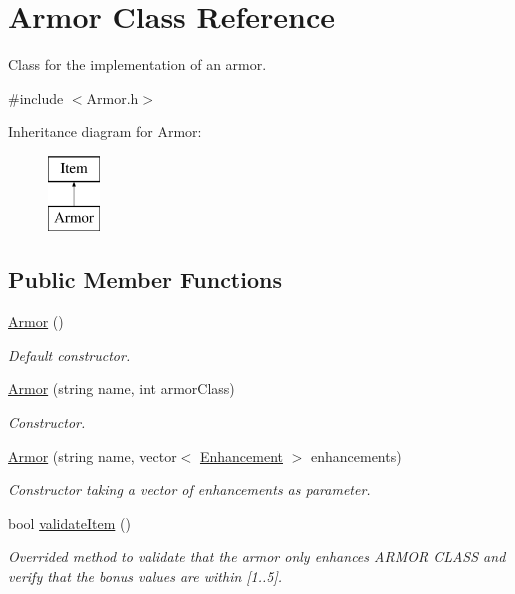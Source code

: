 \hypertarget{class_armor}{}\section{Armor Class Reference}
\label{class_armor}


Class for the implementation of an armor.  




{\ttfamily \#include $<$Armor.\+h$>$}

Inheritance diagram for Armor\+:\begin{figure}[H]
\begin{center}
\leavevmode
\includegraphics[height=2.000000cm]{class_armor}
\end{center}
\end{figure}
\subsection*{Public Member Functions}
\begin{DoxyCompactItemize}
\item 
\hypertarget{class_armor_a23323e95bbeb488eb6fe54cbd83d49a2}{}\label{class_armor_a23323e95bbeb488eb6fe54cbd83d49a2} 
\hyperlink{class_armor_a23323e95bbeb488eb6fe54cbd83d49a2}{Armor} ()
\begin{DoxyCompactList}\small\item\em Default constructor. \end{DoxyCompactList}\item 
\hyperlink{class_armor_a64d656ec063fbefab565d1115f725a93}{Armor} (string name, int armor\+Class)
\begin{DoxyCompactList}\small\item\em Constructor. \end{DoxyCompactList}\item 
\hyperlink{class_armor_a2911c5c6132e32d6de2693ffffb8fc76}{Armor} (string name, vector$<$ \hyperlink{class_enhancement}{Enhancement} $>$ enhancements)
\begin{DoxyCompactList}\small\item\em Constructor taking a vector of enhancements as parameter. \end{DoxyCompactList}\item 
bool \hyperlink{class_armor_a97b69f2691b172bd79e256a487a7f204}{validate\+Item} ()
\begin{DoxyCompactList}\small\item\em Overrided method to validate that the armor only enhances \textquotesingle{}A\+R\+M\+OR C\+L\+A\+SS\textquotesingle{} and verify that the bonus values are within \mbox{[}1..5\mbox{]}. \end{DoxyCompactList}\end{DoxyCompactItemize}
